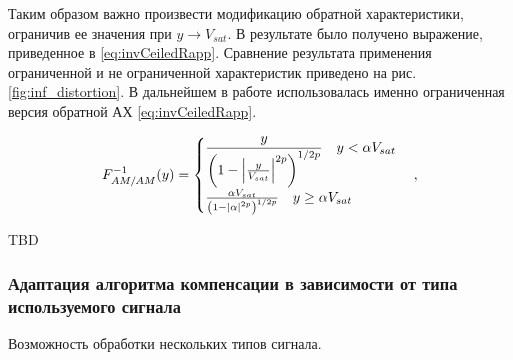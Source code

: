 Таким образом важно произвести модификацию обратной характеристики,
ограничив ее значения при $y \rightarrow V_{sat}$. В результате было
получено выражение, приведенное в \ref{eq:invCeiledRapp}. Сравнение
результата применения ограниченной и не ограниченной характеристик
приведено на рис. \ref{fig:inf_distortion}. В дальнейшем в работе
использовалась именно ограниченная версия обратной АХ \ref{eq:invCeiledRapp}.

\begin{equation}
    F^{-1}_{AM/AM}(y) = 
    \begin{cases}
        \displaystyle
       \frac{ y}{\left( 1 - \abs{\frac{y}{V_{sat}}}^{2p}\right)^{1/2p}}
       \quad y <\alpha V_{sat}\\
       \frac{ \alpha V_{sat}}{\left( 1 - \abs{\alpha}^{2p}\right)^{1/2p}}
       \quad y \geq \alpha V_{sat}
    \end{cases},
    \label{eq:invCeiledRapp}
\end{equation}




TBD





\subsubsection{Адаптация алгоритма компенсации в зависимости от типа используемого сигнала}
Возможность обработки нескольких типов сигнала.